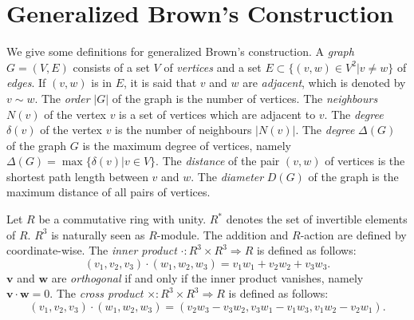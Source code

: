 \documentclass{article}
\newcommand{\Z}{\mathbb Z}
\newcommand{\N}{\mathbb N}
\begin{document}
\iffalse

The {\it tensor product} of two graphs $G_1=(V_1,E_1),G_2=(V_2,E_2)$ is a graph $G_1 \otimes G_2$ such that the vertex set is a cartesian product of $V_1$ and $V_2$ and two vertices $(v_1,v_2) \sim (w_1,w_2)$ if and only if $v_1 \sim v_2$ and $w_1 \sim w_2$. If $G_1, G_2$ are regular, the tensor product $G_1 \times G_2$ is also regular. 

\fi

\section{Generalized Brown's Construction}
We give some definitions for generalized Brown's construction.
A {\it graph} $G=(V,E)$ consists of a set $V$ of {\it vertices} and a set $E \subset \{(v,w) \in V^2 | v \neq w \}$ of {\it edges}.
If $(v,w)$ is in $E$, it is said that $v$ and $w$ are {\it adjacent}, which is denoted by $v \sim w$.
The {\it order} $|G|$ of the graph is the number of vertices. 
The {\it neighbours} $N(v)$ of the vertex $v$ is a set of vertices which are adjacent to $v$.
The {\it degree} $\delta(v)$ of the vertex $v$ is the number of neighbours $| N(v) |$.  
The {\it degree} $\Delta(G)$ of the graph $G$ is the maximum degree of vertices, namely $\Delta(G)=\max\{\delta(v)|v\in V\}$.
The {\it distance} of the pair $(v,w)$ of vertices is the shortest path length between $v$ and $w$. 
The {\it diameter} $D(G)$ of the graph is the  maximum distance of all pairs of vertices.

Let $R$ be a commutative ring with unity. 
$R^*$ denotes the set of invertible elements of $R$.
$R^3$ is naturally seen as $R$-module. 
The addition and $R$-action are defined by coordinate-wise.
The {\it inner product} $\cdot: R^3 \times R^3 \Rightarrow R$ is defined as follows:
\[ (v_1,v_2,v_3) \cdot (w_1,w_2,w_3) = v_1 w_1 + v_2 w_2 + v_3 w_3 .\]
${\bm v}$ and ${\bm w}$ are {\it orthogonal} if and only if the inner product vanishes, namely ${\bm v} \cdot {\bm w} = 0$.
The {\it cross product} $\times: R^3 \times R^3 \Rightarrow R$ is defined as follows:
\[ (v_1,v_2,v_3) \cdot (w_1,w_2,w_3) = ( v_2 w_3 - v_3 w_2, v_3 w_1 - v_1 w_3, v_1 w_2 - v_2 w_1 ). \]
\iffalse
A {\it domain} $D$ is a commutative ring without zero divisors.
A {\it Euclidean domain} is a domain $E$ with a function called degree $d: E \setminus \{0\} \Rightarrow \N$ such that for all non-zero $a,b$ in $E$ there exists $q,r \in E, a = q b + r$ where $d(r) < d(b)$. Every {\it Euclidean domain} is a {\it unique factorization domain}, in which for all $r$ in $E$, there exist prime elements $u_i$ and natural numbers $k_i$ such that $r = \Pi_i u_i^{k_i}$.
The ring of integers $\Z$ is a example of the Euclidean domain whose degree function is an identity function.
\fi
\end{document}
